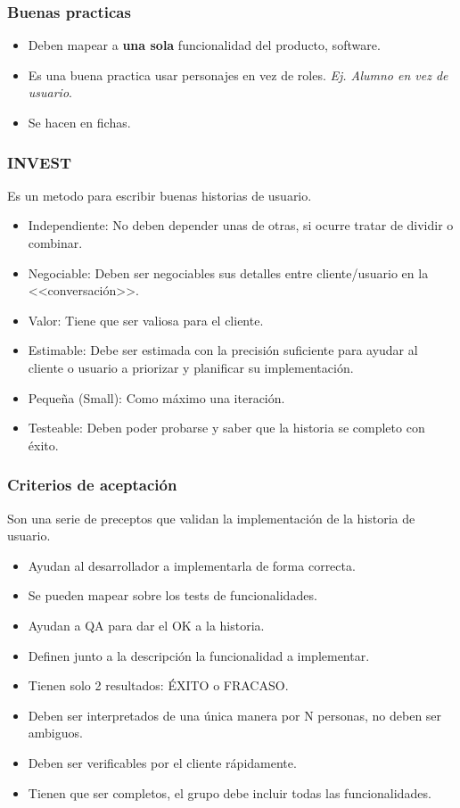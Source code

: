 \documentclass[titlepage,a4paper]{article}
\begin{document}
\subsubsection*{Buenas practicas}
\begin{itemize}
    \item Deben mapear a \textbf{una sola} funcionalidad del producto, software.
    \item Es una buena practica usar personajes en vez de roles. \textit{Ej. Alumno en vez de usuario}.
    \item Se hacen en fichas.
\end{itemize}

\subsubsection*{INVEST}
Es un metodo para escribir buenas historias de usuario.
\begin{itemize}
    \item Independiente: No deben depender unas de otras, si ocurre tratar de dividir o combinar.
    \item Negociable: Deben ser negociables sus detalles entre cliente/usuario en la <<conversación>>.
    \item Valor: Tiene que ser valiosa para el cliente.
    \item Estimable: Debe ser estimada con la precisión suficiente para ayudar al cliente o usuario a priorizar y planificar su implementación.
    \item Pequeña (Small): Como máximo una iteración.
    \item Testeable: Deben poder probarse y saber que la historia se completo con éxito.
\end{itemize}

\subsubsection*{Criterios de aceptación}
Son una serie de preceptos que validan la implementación de la historia de usuario.
\begin{itemize}
    \item Ayudan al desarrollador a implementarla de forma correcta.
    \item Se pueden mapear sobre los tests de funcionalidades.
    \item Ayudan a QA para dar el OK a la historia.
    \item Definen junto a la descripción la funcionalidad a implementar.
    \item Tienen solo 2 resultados: ÉXITO o FRACASO.
    \item Deben ser interpretados de una única manera por N personas, no deben ser ambiguos.
    \item Deben ser verificables por el cliente rápidamente.
    \item Tienen que ser completos, el grupo debe incluir todas las funcionalidades.
\end{itemize}
\end{document}
